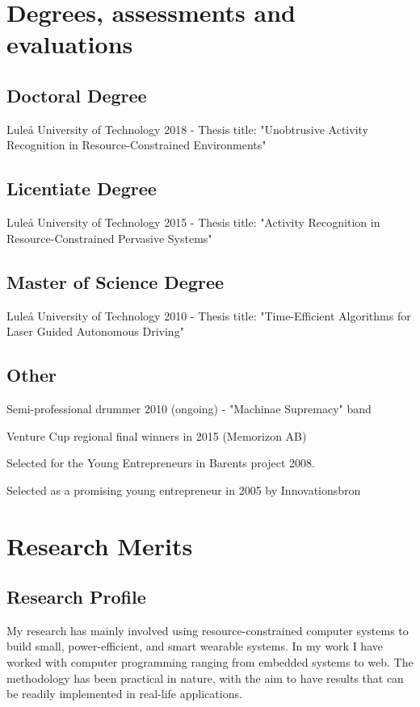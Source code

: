 \documentclass{article}
\begin{document}
\newpage

\section{Degrees, assessments and evaluations}
\subsection{Doctoral Degree}
Luleå University of Technology 2018 - Thesis title: "Unobtrusive Activity Recognition in Resource-Constrained Environments" \\

\subsection{Licentiate Degree}
Luleå University of Technology 2015 - Thesis title: "Activity Recognition in Resource-Constrained Pervasive Systems" \\

\subsection{Master of Science Degree}
Luleå University of Technology 2010 - Thesis title: "Time-Efficient Algorithms for Laser Guided Autonomous Driving" \\

\subsection{Other}
\begin{description}
\item Semi-professional drummer 2010 (ongoing) - "Machinae Supremacy" band
\item Venture Cup regional final winners in 2015 (Memorizon AB)
\item Selected for the Young Entrepreneurs in Barents project 2008.
\item Selected as a promising young entrepreneur in 2005 by Innovationsbron
\end{description}


\newpage

\section{Research Merits}
\subsection{Research Profile}
My research has mainly involved using resource-constrained computer systems to build small, power-efficient, and smart wearable systems. In my work I have worked with computer programming ranging from embedded systems to web. The methodology has been practical in nature, with the aim to have results that can be readily implemented in real-life applications.
\end{document}
